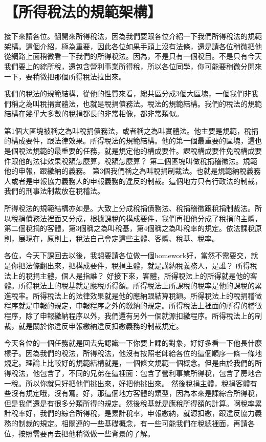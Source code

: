 \documentclass[]{ctexbook}
\begin{document}
\hypertarget{ux6240ux5f97ux7a05ux6cd5ux7684ux898fux7bc4ux67b6ux69cb}{%
\section{【所得稅法的規範架構】}\label{ux6240ux5f97ux7a05ux6cd5ux7684ux898fux7bc4ux67b6ux69cb}}

接下來請各位。翻開來所得稅法，因為我們要跟各位介紹一下我們所得稅法的規範架構。這個介紹，極為重要，因此各位如果手頭上沒有法條，還是請各位稍微把他從網路上面稍微看一下我們的所得稅法。因為，不是只有一個稅目。不是只有今天我們要上的綜所稅，還包含營利事業所得稅，所以各位同學，你可能要稍微分開來一下，要稍微把那個所得稅法拉出來。

我們的稅法的規範結構，從他的性質來看，總共區分成3個大區塊，一個我們非我們稱之為叫稅捐實體法，也就是稅捐債務法。稅法的規範結構。我們的稅法的規範結構在幾乎大多數的稅捐都長的非常相像，都非常類似。

第1個大區塊被稱之為叫稅捐債務法，或者稱之為叫實體法。他主要是規範，稅捐的構成要件，跟法律效果。所得稅法的規範結構。他的第一個最重要的區塊，這也是個稅法規範的最重要的任務，就是規定他的構成要件。課稅構成要件免稅構成要件跟他的法律效果稅額怎麼算，稅額怎麼算？
第二個區塊叫做稅捐稽徵法。規範他的申報，跟繳納的義務。
第3個我們稱之為叫稅捐制裁法。也就是規範納稅義務人或者是申報協力義務人的申報義務的違反的制裁。這個地方只有行政法的制裁，我們的刑事法制裁放在稅稽法。

所得稅法的規範結構亦如是。大致上分成稅捐債務法、稅捐稽徵跟稅捐制裁法。所以稅捐債務法裡面又分成，根據課稅的構成要件，我們再把他分成了稅捐的主體，第二個稅捐的客體，第3個稱之為叫稅基，第4個稱之為叫稅率的規定。依法課稅原則，展現在，原則上，稅法自己會定這些主體、客體、稅基、稅率。

各位，今天下課回去以後，我想要請各位做一個homework好，當然不需要交，就是你把法條翻出來，把構成要件，稅捐主體，就是講納稅義務人，是誰？ 所得稅法上的稅捐主體，個人是指誰？ 好接下來，客體，所得稅法上的所得就是他的客體。所得稅法上的稅基就是應稅所得額。所得稅法上所課稅的稅率是他的課稅的累進稅率。所得稅法上的法律效果就是他的應納跟結算稅額。所得稅法上的稅捐稽徵程序就是申報的規定，申報程序之外的繳納的規定。所得稅法上裡面的所得的稽徵程序，除了申報繳納程序以外，我們還有另外一個就源扣繳程序。所得稅法上的制裁，就是關於你違反申報繳納違反扣繳義務的制裁規定。

今天各位的一個任務就是回去先認識一下你要上課的對象，好好多看一下他長什麼樣子。因為我們的稅法，所得稅法，他沒有按照老師給各位的這個順序一條一條地規定。理論上比較好的規範結構就是，一個條文規範一個概念。但是由於我們的所得稅法，他包含了，不同的兄弟在這裡面：包含了營利事業所得稅，包含了房地合一稅。所以你就只好把他們挑出來，好把他挑出來。
然後稅捐主體，稅捐客體有些沒有規定哦，沒有寫。好，那這個地方客體的類型，因為本來是課綜合所得稅，但是我們還是有很多分類所得的規定。然後稅基就是應稅所得額的計算。啊稅率累計稅率好，我們的綜合所得稅，是累計稅率，申報繳納，就源扣繳，跟違反協力義務的制裁的規定。相關連的一些基礎概念，有一些可能我們在稅總裡面，再請各位，按照需要再去把他稍微做一些背景的了解。
\end{document}
